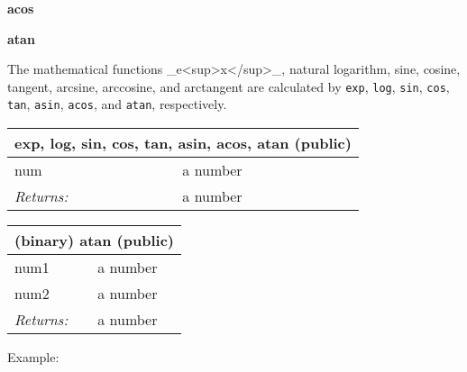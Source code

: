 \documentclass{report}
\begin{document}
\textbf{acos}


\textbf{atan}


The mathematical functions \_e<sup>x</sup>\_, natural logarithm, sine, cosine, tangent, arcsine, arccosine, and arctangent are calculated by \texttt{exp}, \texttt{log}, \texttt{sin}, \texttt{cos}, \texttt{tan}, \texttt{asin}, \texttt{acos}, and \texttt{atan}, respectively.

\begin{tabular}{ |l l| }
\hline
\multicolumn{2}{|l|}{exp, log, sin, cos, tan, asin, acos, atan (public)} \\
\hline
num & a number \\
\textit{Returns:} & a number \\
\hline
\end{tabular}

\begin{tabular}{ |l l| }
\hline
\multicolumn{2}{|l|}{(binary) atan (public)} \\
\hline
num1 & a number \\
num2 & a number \\
\textit{Returns:} & a number \\
\hline
\end{tabular}


Example:
\end{document}
